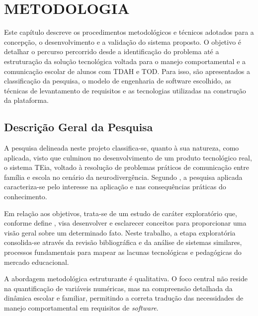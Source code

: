 
\chapter{METODOLOGIA}
\label{chap:metodologia}

Este capítulo descreve os procedimentos metodológicos e técnicos adotados para a concepção, o desenvolvimento e a validação do sistema proposto. O objetivo é detalhar o percurso percorrido desde a identificação do problema até a estruturação da solução tecnológica voltada para o manejo comportamental e a comunicação escolar de alunos com TDAH e TOD. Para isso, são apresentados a classificação da pesquisa, o modelo de engenharia de software escolhido, as técnicas de levantamento de requisitos e as tecnologias utilizadas na construção da plataforma.

\vspace{0.5cm}
\section{Descrição Geral da Pesquisa}

A pesquisa delineada neste projeto classifica-se, quanto à sua natureza, como aplicada, visto que culminou no desenvolvimento de um produto tecnológico real, o sistema TEia, voltado à resolução de problemas práticos de comunicação entre família e escola no cenário da neurodivergência. Segundo , a pesquisa aplicada caracteriza-se pelo interesse na aplicação e nas consequências práticas do conhecimento.

Em relação aos objetivos, trata-se de um estudo de caráter exploratório que, conforme define , visa desenvolver e esclarecer conceitos para proporcionar uma visão geral sobre um determinado fato. Neste trabalho, a etapa exploratória consolida-se através da revisão bibliográfica e da análise de sistemas similares, processos fundamentais para mapear as lacunas tecnológicas e pedagógicas do mercado educacional.

A abordagem metodológica estruturante é qualitativa. O foco central não reside na quantificação de variáveis numéricas, mas na compreensão detalhada da dinâmica escolar e familiar, permitindo a correta tradução das necessidades de manejo comportamental em requisitos de \textit{software}.


